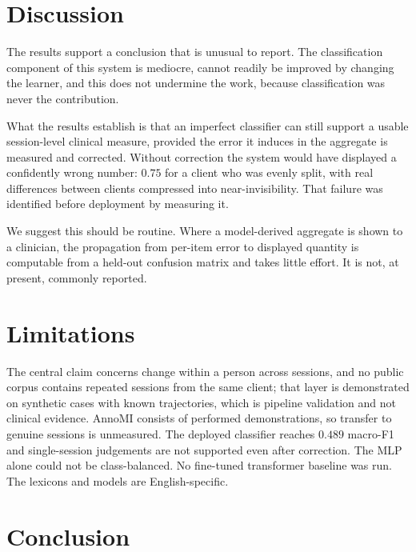 \documentclass[conference]{IEEEtran}
\begin{document}
\section{Discussion}

The results support a conclusion that is unusual to report. The classification
component of this system is mediocre, cannot readily be improved by changing
the learner, and this does not undermine the work, because classification was
never the contribution.

What the results establish is that an imperfect classifier can still support a
usable session-level clinical measure, provided the error it induces in the
aggregate is measured and corrected. Without correction the system would have
displayed a confidently wrong number: $0.75$ for a client who was evenly split,
with real differences between clients compressed into near-invisibility. That
failure was identified before deployment by measuring it.

We suggest this should be routine. Where a model-derived aggregate is shown to
a clinician, the propagation from per-item error to displayed quantity is
computable from a held-out confusion matrix and takes little effort. It is not,
at present, commonly reported.

\section{Limitations}

The central claim concerns change within a person across sessions, and no
public corpus contains repeated sessions from the same client; that layer is
demonstrated on synthetic cases with known trajectories, which is pipeline
validation and not clinical evidence. AnnoMI consists of performed
demonstrations, so transfer to genuine sessions is unmeasured. The deployed
classifier reaches $0.489$ macro-F1 and single-session judgements are not
supported even after correction. The MLP alone could not be class-balanced. No
fine-tuned transformer baseline was run. The lexicons and models are
English-specific.

\section{Conclusion}
\end{document}
